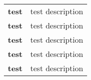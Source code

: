 
\begin{center}
	\begin{tabular}{ | m{} | m{} | }
		\hline
		
		\textbf{test} & test description \\
		\textbf{test} & test description \\
		\textbf{test} & test description \\
		\textbf{test} & test description \\
		\textbf{test} & test description \\
		
		\hline
	\end{tabular}
\end{center}